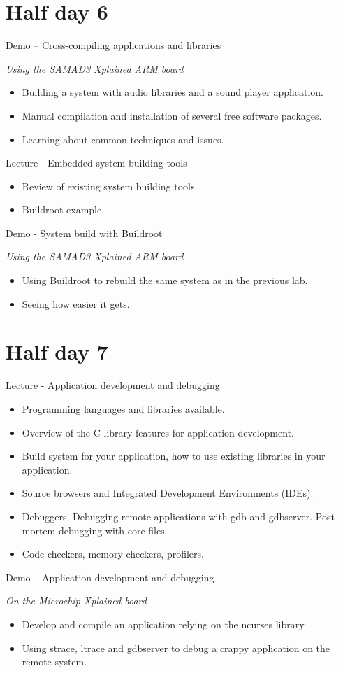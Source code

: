 \documentclass[a4paper,12pt,obeyspaces,spaces,hyphens]{article}
\begin{document}
\section{Half day 6}

\feagendaonecolumn
{Demo – Cross-compiling applications and libraries}
{
  {\em Using the SAMAD3 Xplained ARM board}
  \begin{itemize}
  \item Building a system with audio libraries and a sound player application.
  \item Manual compilation and installation of several free software packages.
  \item Learning about common techniques and issues.
  \end{itemize}
}

\feagendatwocolumn
{Lecture - Embedded system building tools}
{
  \begin{itemize}
  \item Review of existing system building tools.
  \item Buildroot example.
  \end{itemize}
}
{Demo - System build with Buildroot}
{
  {\em Using the SAMAD3 Xplained ARM board}
  \begin{itemize}
  \item Using Buildroot to rebuild the same system as in the previous lab.
  \item Seeing how easier it gets.
  \end{itemize}
}

\section{Half day 7}

\feagendatwocolumn
{Lecture - Application development and debugging}
{
  \begin{itemize}
  \item Programming languages and libraries available.
  \item Overview of the C library features for application development.
  \item Build system for your application,
        how to use existing libraries in your application.
  \item Source browsers and Integrated Development Environments (IDEs).
  \item Debuggers. Debugging remote applications with gdb and gdbserver.
        Post-mortem debugging with core files.
  \item Code checkers, memory checkers, profilers.
  \end{itemize}
}
{Demo – Application development and debugging}
{
  {\em On the Microchip Xplained board}
  \begin{itemize}
  \item Develop and compile an application relying on the ncurses library
  \item Using strace, ltrace and gdbserver to debug a crappy application
        on the remote system.
  \end{itemize}
}
\end{document}
